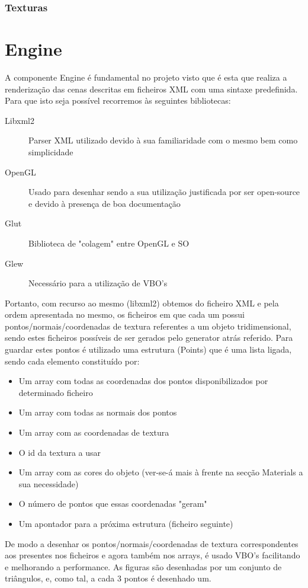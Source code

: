 \documentclass{article}
\begin{document}
\subsubsection{Texturas}

\newpage

\section{Engine}
A componente Engine é fundamental no projeto visto que é esta que realiza a renderização das cenas descritas em ficheiros XML com uma sintaxe predefinida.
Para que isto seja possível recorremos às seguintes bibliotecas:
\begin{description}
    \item [Libxml2] Parser XML utilizado devido à sua familiaridade com o mesmo bem como simplicidade
    \item [OpenGL] Usado para desenhar sendo a sua utilização justificada por ser open-source e devido à presença de boa documentação
    \item [Glut] Biblioteca de "colagem" entre OpenGL e SO
    \item [Glew] Necessário para a utilização de VBO's
\end{description}
Portanto, com recurso ao mesmo (libxml2) obtemos do ficheiro XML e pela ordem apresentada no mesmo, os ficheiros em que cada um possui pontos/normais/coordenadas de textura referentes a um objeto tridimensional, sendo estes ficheiros possíveis de ser gerados pelo generator atrás referido. 
Para guardar estes pontos é utilizado uma estrutura (Points) que é uma lista ligada, sendo cada elemento constituído por:
\begin{itemize}
    \item Um array com todas as coordenadas dos pontos disponibilizados por determinado ficheiro
    \item Um array com todas as normais dos pontos
    \item Um array com as coordenadas de textura
    \item O id da textura a usar
    \item Um array com as cores do objeto (ver-se-á mais à frente na secção Materials a sua necessidade)
    \item O número de pontos que essas coordenadas "geram"
    \item Um apontador para a próxima estrutura (ficheiro seguinte)
\end{itemize}
De modo a desenhar os pontos/normais/coordenadas de textura correspondentes aos presentes nos ficheiros e agora também nos arrays, é usado VBO's facilitando e melhorando a performance. As figuras são desenhadas por um conjunto de triângulos, e, como tal, a cada 3 pontos é desenhado um. 
\end{document}
